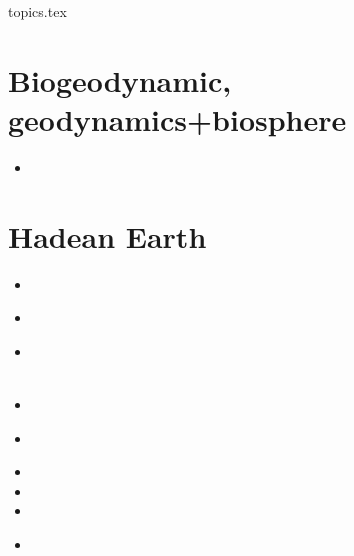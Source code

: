 
\begin{flushright} {\tiny {\color{gray} topics.tex}} \end{flushright}

\section{Biogeodynamic, geodynamics+biosphere}

\begin{small}
\begin{itemize}
\item[\twothousandtwentythree]
 \\
\end{itemize}
\end{small}


\section{Hadean Earth}

\begin{small}
\begin{itemize}
\item[\twothousandseven]     
 \\
\item[\twothousandthirteen]       
 \\ 
\item[\twothousandfourteen]       
 \\ 
 \\ 
\item[\twothousandsixteen] 
\item[\twothousandseventeen] 
 \\ 
\item[\twothousandeighteen] 
\item[\twothousandtwenty]
\item[\twothousandtwentyone]
\item[\twothousandtwentytwo]
 \\
\end{itemize}
\end{small}


